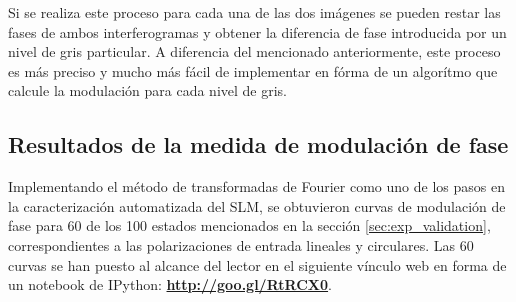 Si se realiza este proceso para cada una de las dos imágenes se pueden restar las
fases de ambos interferogramas y obtener la diferencia de fase
introducida por un nivel de gris particular. A diferencia del
mencionado anteriormente, este proceso es más preciso y mucho más fácil de implementar en fórma de
un algorítmo que calcule la modulación para cada nivel de gris. 
\subsection{Resultados de la medida de modulación de fase}

Implementando el método de transformadas de Fourier como uno de los
pasos en la caracterización automatizada del SLM, se obtuvieron curvas de modulación
de fase para 60 de los 100 estados mencionados en la sección
\ref{sec:exp_validation}, correspondientes a las polarizaciones de
entrada lineales y circulares.  Las 60 curvas se han puesto al alcance del
lector en el siguiente vínculo web en forma de un notebook de IPython:
\href{http://goo.gl/RtRCX0}{\textbf{http://goo.gl/RtRCX0}}.  

